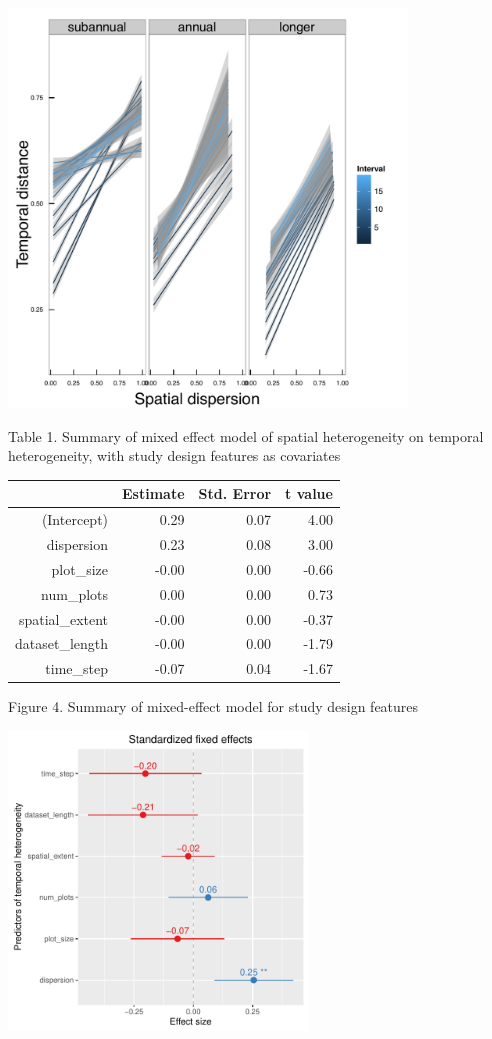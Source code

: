 \documentclass[11pt]{article}
\begin{document}
\includegraphics[width=400px]{SpatialTemporalInterval}
\newpage


Table 1. Summary of mixed effect model of spatial heterogeneity on temporal heterogeneity, with study design features as covariates

\FloatBarrier
\begin{table}[ht]
\centering
\begin{tabular}{rrrr}
  \hline
 & Estimate & Std. Error & t value \\ 
  \hline
(Intercept) & 0.29 & 0.07 & 4.00 \\ 
  dispersion & 0.23 & 0.08 & 3.00 \\ 
  plot\_size & -0.00 & 0.00 & -0.66 \\ 
  num\_plots & 0.00 & 0.00 & 0.73 \\ 
  spatial\_extent & -0.00 & 0.00 & -0.37 \\ 
  dataset\_length & -0.00 & 0.00 & -1.79 \\ 
  time\_step & -0.07 & 0.04 & -1.67 \\ 
   \hline
\end{tabular}
\end{table}
\FloatBarrier



Figure 4. Summary of mixed-effect model for study design features 

\includegraphics[width=300px]{designmodel}
\pagebreak
\end{document}
